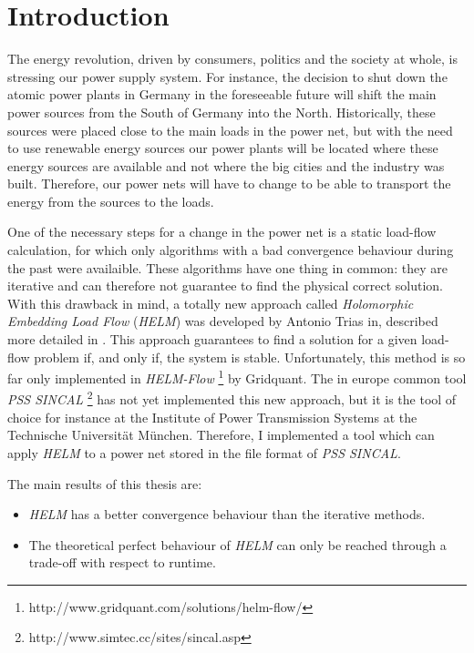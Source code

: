 \chapter{Introduction}
The energy revolution, driven by consumers, politics and the society at whole, is stressing our power supply system. For instance, the decision to shut down the atomic power plants in Germany in the foreseeable future will shift the main power sources from the South of Germany into the North. Historically, these sources were placed close to the main loads in the power net, but with the need to use renewable energy sources our power plants will be located where these energy sources are available and not where the big cities and the industry was built. Therefore, our power nets will have to change to be able to transport the energy from the sources to the loads.

One of the necessary steps for a change in the power net is a static load-flow calculation, for which only algorithms with a bad convergence behaviour during the past were availaible. These algorithms have one thing in common: they are iterative and can therefore not guarantee to find the physical correct solution. With this drawback in mind, a totally new approach called \emph{Holomorphic Embedding Load Flow} (\emph{HELM})  \citep{helmIEEE} was developed by Antonio Trias in, described more detailed in . This approach guarantees to find a solution for a given load-flow problem if, and only if, the system is stable. Unfortunately, this method is so far only implemented in \emph{HELM-Flow} \footnote{http://www.gridquant.com/solutions/helm-flow/} by Gridquant. The in europe common tool \emph{PSS SINCAL} \footnote{http://www.simtec.cc/sites/sincal.asp} has not yet implemented this new approach, but it is the tool of choice for instance at the Institute of Power Transmission Systems at the Technische Universität München. Therefore, I implemented a tool which can apply \emph{HELM} to a power net stored in the file format of \emph{PSS SINCAL}.

The main results of this thesis are:
\begin{itemize}
	\item \emph{HELM} has a better convergence behaviour than the iterative methods.
	\item The theoretical perfect behaviour of \emph{HELM} can only be reached through a trade-off with respect to runtime.
\end{itemize}